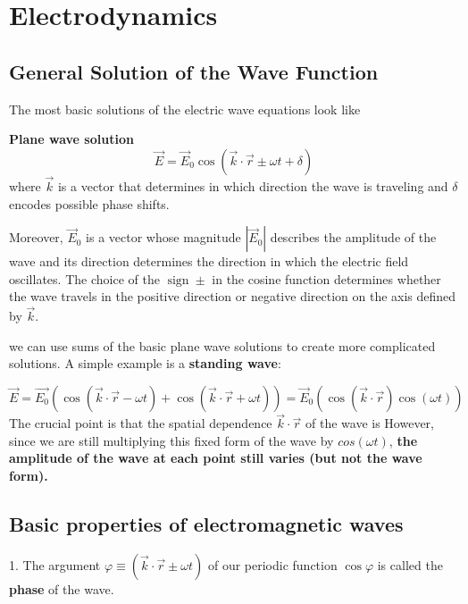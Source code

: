 \section{Electrodynamics}
\subsection{General Solution of the Wave Function}
The most basic solutions of the electric wave equations look like
\begin{qt}
\textbf{Plane wave solution}
\begin{equation}
\vec{E}=\vec{E}_{0} \cos (\vec{k} \cdot \vec{r} \pm \omega t+\delta)
\end{equation}
where $\vec{k}$ is a vector that determines in which direction the wave is traveling and $\delta$ encodes possible phase shifts.

Moreover, $\vec{E}_{0}$ is a vector whose magnitude $\left|\vec{E}_{0}\right|$ describes the amplitude of the wave and its direction determines the direction in which the electric field oscillates. The choice of the $\operatorname{sign} \pm$ in the cosine function determines whether the wave travels in the positive direction or negative direction on the axis defined by $\vec{k}$.
\end{qt}
we can use sums of the basic plane wave solutions to create more complicated solutions. A simple example is a \textbf{standing wave}:
\begin{qt}
\begin{equation}
\vec{E}=\overrightarrow{E_{0}}(\cos (\vec{k} \cdot \vec{r}-\omega t)+\cos (\vec{k} \cdot \vec{r}+\omega t))=\vec{E}_{0}(\cos (\vec{k} \cdot \vec{r}) \cos (\omega t))
\end{equation}
The crucial point is that the spatial dependence $\vec{k} \cdot \vec{r}$ of the wave is  However, since we are still multiplying this fixed form of the wave by $cos(\omega t)$, \textbf{the amplitude of the wave at each point still varies (but not the wave form).}
\end{qt}

\subsection{Basic properties of electromagnetic waves}
1. The argument $\varphi \equiv(\vec{k} \cdot \vec{r} \pm \omega t)$ of our periodic function $\cos \varphi$ is called the \textbf{phase} of the wave.


